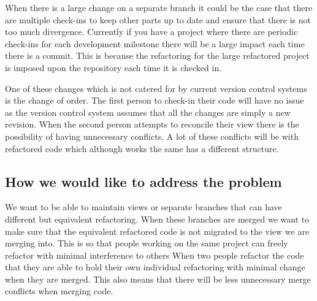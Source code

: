 % 

% 
% 
% 




When there is a large change on a separate branch it could be the case that there are multiple check-ins to keep other parts up to date and ensure that there is not too much divergence.  Currently if you have a project where there are periodic check-ins for each development milestone there will be a large impact each time there is a commit. This is because the refactoring for the large refactored project is imposed upon the repository each time it is checked in.



One of these changes which is not catered for by current version control systems is the change of order.  The first person to check-in their code will have no issue as the version control system assumes that all the changes are simply a new revision.  When the second person attempts to reconcile their view there is the possibility of having unnecessary conflicts.  A lot of these conflicts will be with refactored code which although works the same has a different structure.

\subsection{How we would like to address the problem}
We want to be able to maintain views or separate branches that can have different but equivalent refactoring.  When these branches are merged we want to make sure that the equivalent refactored code is not migrated to the view we are merging into.
This is so that people working on the same project can freely refactor with minimal interference to others
When two people refactor the code that they are able to hold their own individual refactoring with minimal change when they are merged.
This also means that there will be less unnecessary merge conflicts when merging code.

